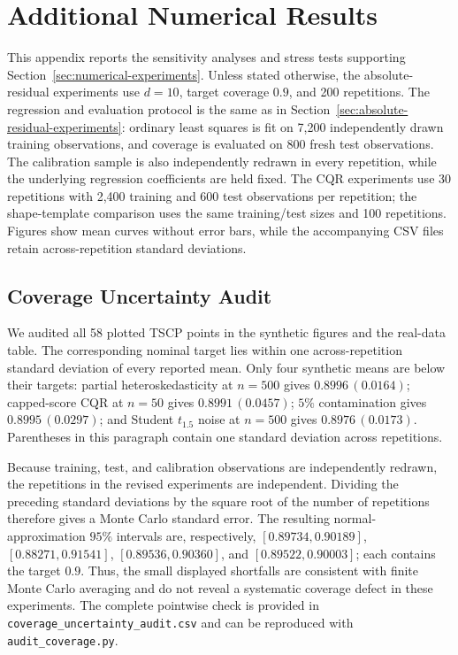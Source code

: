 
\begingroup
\color{blue}

\section{Additional Numerical Results}
\label{app:additional-experiments}

This appendix reports the sensitivity analyses and stress tests supporting
Section~\ref{sec:numerical-experiments}. Unless stated otherwise, the
absolute-residual experiments use $d=10$, target coverage $0.9$, and 200
repetitions. The regression and evaluation protocol is the same as in
Section~\ref{sec:absolute-residual-experiments}: ordinary least squares is fit
on 7,200 independently drawn training observations, and coverage is evaluated
on 800 fresh test observations. The calibration sample is also independently
redrawn in every repetition, while the underlying regression coefficients are
held fixed. The CQR experiments use 30 repetitions with 2,400 training and 600
test observations per repetition; the shape-template comparison uses the same
training/test sizes and 100 repetitions. Figures show mean curves without
error bars, while the accompanying CSV files retain across-repetition standard
deviations.

\subsection{Coverage Uncertainty Audit}
\label{app:coverage-uncertainty}

We audited all 58 plotted TSCP points in the synthetic figures and the
real-data table. The corresponding nominal target lies within one
across-repetition standard deviation of every reported mean. Only four
synthetic means are below their targets: partial heteroskedasticity at
$n=500$ gives $0.8996\,(0.0164)$; capped-score CQR at $n=50$ gives
$0.8991\,(0.0457)$; $5\%$ contamination gives $0.8995\,(0.0297)$; and
Student $t_{1.5}$ noise at $n=500$ gives $0.8976\,(0.0173)$. Parentheses in
this paragraph contain one standard deviation across repetitions.

Because training, test, and calibration observations are independently
redrawn, the repetitions in the revised experiments are independent. Dividing
the preceding standard deviations by the square root of the number of
repetitions therefore gives a Monte Carlo standard error. The resulting
normal-approximation $95\%$ intervals are, respectively,
$[0.89734,0.90189]$, $[0.88271,0.91541]$, $[0.89536,0.90360]$, and
$[0.89522,0.90003]$; each contains the target $0.9$. Thus, the small displayed
shortfalls are consistent with finite Monte Carlo averaging and do not reveal
a systematic coverage defect in these experiments. The complete pointwise
check is provided in \texttt{coverage\_uncertainty\_audit.csv} and can be
reproduced with \texttt{audit\_coverage.py}.


